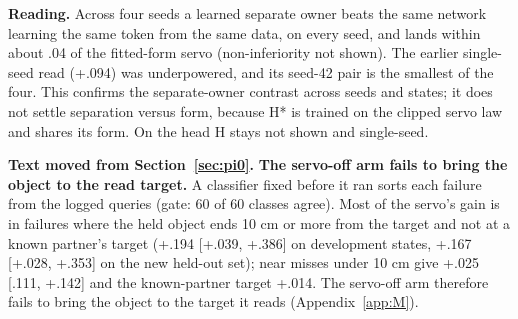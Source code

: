 \textbf{Reading.} Across four seeds a learned separate owner beats the same network learning the same token from the same data, on every seed, and lands within about .04 of the fitted-form servo (non-inferiority not shown). The earlier single-seed read (+.094) was underpowered, and its seed-42 pair is the smallest of the four. This confirms the separate-owner contrast across seeds and states; it does not settle separation versus form, because H* is trained on the clipped servo law and shares its form. On \pifive{} the head H stays not shown and single-seed.

\textbf{Text moved from Section~\ref{sec:pi0}.} \textbf{The servo-off arm fails to bring the object to the read target.} A classifier fixed before it ran sorts each failure from the logged queries (gate: 60 of 60 classes agree). Most of the servo's gain is in failures where the held object ends 10 cm or more from the target and not at a known partner's target (+.194 [+.039, +.386] on development states, +.167 [+.028, +.353] on the new held-out set); near misses under 10 cm give +.025 [\mi.111, +.142] and the known-partner target +.014. The servo-off arm therefore fails to bring the object to the target it reads (Appendix~\ref{app:M}).
